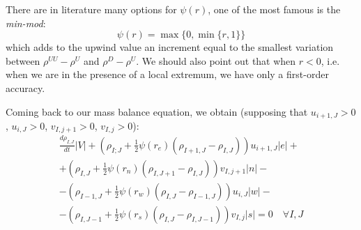 \documentclass[12pt, a4paper]{article}
\begin{document}
There are in literature many options for $\psi(r)$, one of the most famous 
is the \emph{min-mod}:
\begin{equation*}
\psi(r) = \max \{0, \min \{ r,1\} \}
\end{equation*}
which adds to the upwind value an increment equal to the smallest 
variation between $\rho^{UU}-\rho^U$ and $\rho^D - \rho^U$. We should also 
point out that when $r < 0$, i.e. when we are in the presence of a local 
extremum, we have only a first-order accuracy.

Coming back to our mass balance equation, we obtain (supposing that $u_{i+1,J} 
>0$, $u_{i,J} > 0$, $v_{I,j+1}>0$, $v_{I,j} >0$):
\begin{multline*}
\frac{d \rho_{I,J}}{dt} |V| + (\rho_{I;J} + \frac{1}{2}\psi(r_e)(\rho_{I+1,J} - 
\rho_{I,J}))u_{i+1,J}|e| +\\
+ (\rho_{I,J} + \frac{1}{2}\psi(r_n)(\rho_{I,J+1} - 
\rho_{I,J}))v_{I,j+1}|n|-\\
	-(\rho_{I-1,J} + \frac{1}{2}\psi(r_w)(\rho_{I,J} - 
	\rho_{I-1,J}))u_{i,J}|w|-\\
	-(\rho_{I,J-1} + \frac{1}{2}\psi(r_s)(\rho_{I,J} - \rho_{I,J-1}))v_{I,j}|s| 
	= 0 \quad \forall {I,J}
\end{multline*}
\end{document}
